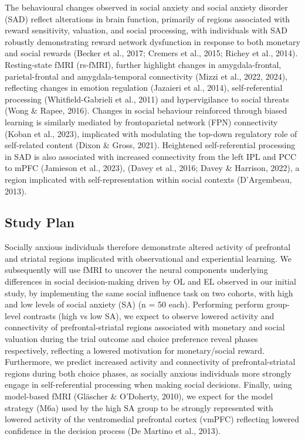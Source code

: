 \documentclass[12pt,a4paper,oneside,]{book} %
\begin{document}
The behavioural changes observed in social anxiety and social anxiety disorder (SAD) reflect alterations in brain function, primarily of regions associated with reward sensitivity, valuation, and social processing, with individuals with SAD robustly demonstrating reward network dysfunction in response to both monetary and social rewards (Becker et al., 2017; Cremers et al., 2015; Richey et al., 2014). Resting-state fMRI (rs-fMRI), further highlight changes in amygdala-frontal, parietal-frontal and amygdala-temporal connectivity (Mizzi et al., 2022, 2024), reflecting changes in emotion regulation (Jazaieri et al., 2014), self-referential processing (Whitfield-Gabrieli et al., 2011) and hypervigilance to social threats (Wong \& Rapee, 2016). Changes in social behaviour reinforced through biased learning is similarly mediated by frontoparietal network (FPN) connectivity (Koban et al., 2023), implicated with modulating the top-down regulatory role of self-related content (Dixon \& Gross, 2021). Heightened self-referential processing in SAD is also associated with increased connectivity from the left IPL and PCC to mPFC (Jamieson et al., 2023), (Davey et al., 2016; Davey \& Harrison, 2022), a region implicated with self-representation within social contexts (D'Argembeau, 2013).

\subsection{Study Plan}\label{study-plan}

Socially anxious individuals therefore demonstrate altered activity of prefrontal and striatal regions implicated with observational and experiential learning. We subsequently will use fMRI to uncover the neural components underlying differences in social decision-making driven by OL and EL observed in our initial study, by implementing the same social influence task on two cohorts, with high and low levels of social anxiety (SA) (n = 50 each). Performing perform group-level contrasts (high vs low SA), we expect to observe lowered activity and connectivity of prefrontal-striatal regions associated with monetary and social valuation during the trial outcome and choice preference reveal phases respectively, reflecting a lowered motivation for monetary/social reward. Furthermore, we predict increased activity and connectivity of prefrontal-striatal regions during both choice phases, as socially anxious individuals more strongly engage in self-referential processing when making social decisions. Finally, using model-based fMRI (Gläscher \& O'Doherty, 2010), we expect for the model strategy (M6a) used by the high SA group to be strongly represented with lowered activity of the ventromedial prefrontal cortex (vmPFC) reflecting lowered confidence in the decision process (De Martino et al., 2013).
\end{document}

